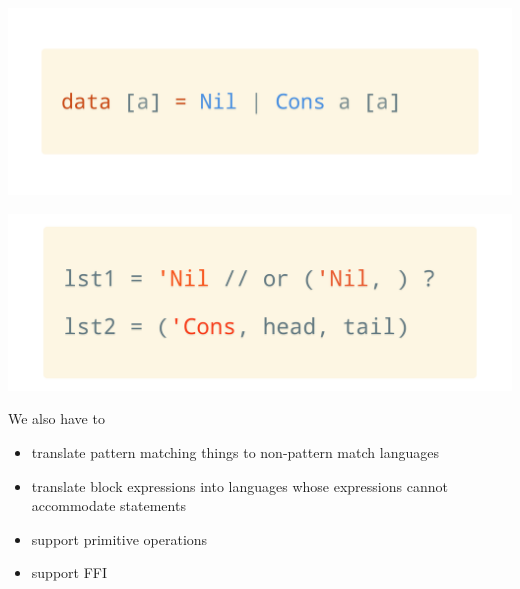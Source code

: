 \documentclass[a1,portrait]{a1poster}
\begin{document}
\begin{multicols}{2}
\begin{multicols}{2}
\begin{minipage}[b]{1\linewidth}
\begin{center}\vspace{0.1cm}
    \includegraphics[width=0.9\linewidth]{figs/tagged-union.png}
\end{center}\vspace{0.1cm}
\end{minipage}

\begin{minipage}[b]{1\linewidth}
\begin{center}\vspace{0.1cm}
    \includegraphics[width=0.9\linewidth]{figs/tagged-union-impl.png}
\end{center}\vspace{0.1cm}
\end{minipage}

\end{multicols}

We also have to

\begin{itemize}
    \setlength\itemsep{-0.1em}
    \item translate pattern matching things to non-pattern match languages
    \item translate block expressions \cite{gcc-stmt-expr} \cite{pep572} into languages whose expressions cannot accommodate statements
    \item support primitive operations
    \item support FFI
\end{itemize}


\end{multicols}
\end{document}
